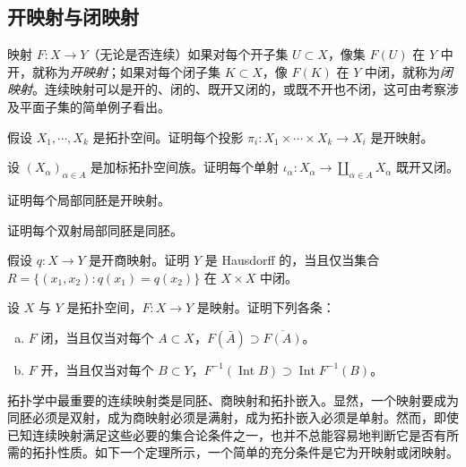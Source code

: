 \documentclass[../../main.tex]{subfiles}
\begin{document}
\subsection*{开映射与闭映射}

映射 $F:X\to Y$（无论是否连续）如果对每个开子集 $U\subset X$，像集 $F(U)$ 在 $Y$ 中开，就称为\emph{开映射}；如果对每个闭子集 $K\subset X$，像 $F(K)$ 在 $Y$ 中闭，就称为\emph{闭映射}。连续映射可以是开的、闭的、既开又闭的，或既不开也不闭，这可由考察涉及平面子集的简单例子看出。

\begin{exercise}\label{exercise:appA-A-32}
假设 $X_1,\cdots ,X_k$ 是拓扑空间。证明每个投影 $\pi_i:X_1\times\cdots\times X_k\to X_i$ 是开映射。
\end{exercise}

\begin{exercise}\label{exercise:appA-A-33}
设 $(X_\alpha)_{\alpha\in A}$ 是加标拓扑空间族。证明每个单射 $\iota_\alpha:X_\alpha\to\coprod_{\alpha\in A}X_\alpha$ 既开又闭。
\end{exercise}

\begin{exercise}\label{exercise:appA-A-34}
证明每个局部同胚是开映射。
\end{exercise}

\begin{exercise}\label{exercise:appA-A-35}
证明每个双射局部同胚是同胚。
\end{exercise}

\begin{exercise}\label{exercise:appA-A-36}
假设 $q:X\to Y$ 是开商映射。证明 $Y$ 是 Hausdorff 的，当且仅当集合 $R=\{(x_1,x_2):q(x_1)=q(x_2)\}$ 在 $X\times X$ 中闭。
\end{exercise}

\begin{exercise}\label{exercise:appA-A-37}
设 $X$ 与 $Y$ 是拓扑空间，$F:X\to Y$ 是映射。证明下列各条：
\begin{enumerate}[(a)]
\item $F$ 闭，当且仅当对每个 $A\subset X$，$F(\bar A)\supset\overline{F(A)}$。
\item $F$ 开，当且仅当对每个 $B\subset Y$，$F^{-1}(\operatorname{Int}B)\supset\operatorname{Int}F^{-1}(B)$。
\end{enumerate}
\end{exercise}

拓扑学中最重要的连续映射类是同胚、商映射和拓扑嵌入。显然，一个映射要成为同胚必须是双射，成为商映射必须是满射，成为拓扑嵌入必须是单射。然而，即使已知连续映射满足这些必要的集合论条件之一，也并不总能容易地判断它是否有所需的拓扑性质。如下一个定理所示，一个简单的充分条件是它为开映射或闭映射。
\end{document}
